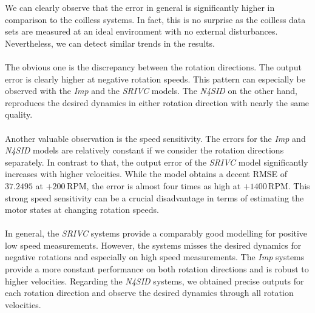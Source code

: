 \documentclass[english]{isasthesis}
\begin{document}
		We can clearly observe that the error in general is significantly higher in comparison to the coilless systems. In fact, this is no surprise as the coilless data sets are measured at an ideal environment with no external disturbances. Nevertheless, we can detect similar trends in the results. \\\\
		The obvious one is the discrepancy between the rotation directions. The output error is clearly higher at negative rotation speeds. This pattern can especially be observed with the \textit{Imp} and the \textit{SRIVC} models. The \textit{N4SID} on the other hand, reproduces the desired dynamics in either rotation direction with nearly the same quality. \\\\
	Another valuable observation is the speed sensitivity. The errors for the \textit{Imp} and \textit{N4SID} models are relatively constant if we consider the rotation directions separately. In contrast to that, the output error of the \textit{SRIVC} model significantly increases with higher velocities. While the model obtains a decent RMSE of $37.2495$ at $+200\,$RPM, the error is almost four times as high at $+1400\,$RPM. This strong speed sensitivity can be a crucial disadvantage in terms of estimating the motor states at changing rotation speeds.\\\\
	In general, the \textit{SRIVC} systems provide a comparably good modelling for positive low speed measurements. However, the systems misses the desired dynamics for negative rotations and especially on high speed measurements. The \textit{Imp} systems provide a more constant performance on both rotation directions and is robust to higher velocities. Regarding the \textit{N4SID} systems, we obtained precise outputs for each rotation direction and observe the desired dynamics through all rotation velocities. 
\end{document}
